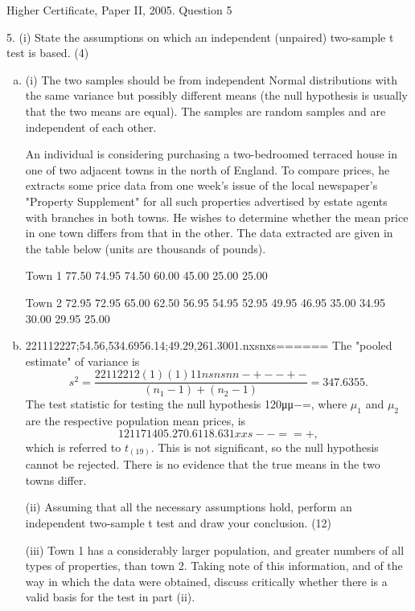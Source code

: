 \documentclass[a4paper,12pt]{article}
\begin{document}
Higher Certificate, Paper II, 2005. Question 5

\begin{framed}
5. (i) State the assumptions on which an independent (unpaired) two-sample t test is based. (4) 
\end{framed} 


\begin{enumerate}[(a)]
    \item 
(i) The two samples should be from independent Normal distributions with the same variance but possibly different means (the null hypothesis is usually that the two means are equal). The samples are random samples and are independent of each other.


 
 
\begin{framed} 
An individual is considering purchasing a two-bedroomed terraced house in one of two adjacent towns in the north of England.  To compare prices, he extracts some price data from one week's issue of the local newspaper's "Property Supplement" for all such properties advertised by estate agents with branches in both towns.  He wishes to determine whether the mean price in one town differs from that in the other.  The data extracted are given in the table below (units are thousands of pounds). 
 
Town 1  77.50 74.95 74.50 60.00 45.00 25.00 25.00 
 
Town 2  72.95 72.95 65.00 62.50 56.95 54.95 52.95     49.95 46.95 35.00 34.95 30.00 29.95 25.00 
\end{framed}
    \item 
221112227;54.56,534.6956.14;49.29,261.3001.nxsnxs======
The "pooled estimate" of variance is
\[s^2 = \frac{22112212(1)(1)11nsnsnn−+−−+−}{(n_1-1) + (n_2-1)} = 347.6355.\]
The test statistic for testing the null hypothesis 120μμ−=, where $\mu_1$ and $\mu_2$ are the respective population mean prices, is
\[121171405.270.6118.631xxs−−==+,\]
which is referred to $t_{(19)}$. This is not significant, so the null hypothesis cannot be rejected. There is no evidence that the true means in the two towns differ.


\begin{framed}
 
(ii) Assuming that all the necessary assumptions hold, perform an independent two-sample t test and draw your conclusion. (12) 
 
(iii) Town 1 has a considerably larger population, and greater numbers of all types of properties, than town 2.  Taking note of this information, and of the way in which the data were obtained, discuss critically whether there is a valid basis for the test in part (ii). 
 


\end{framed}
\end{enumerate}
\end{document}
